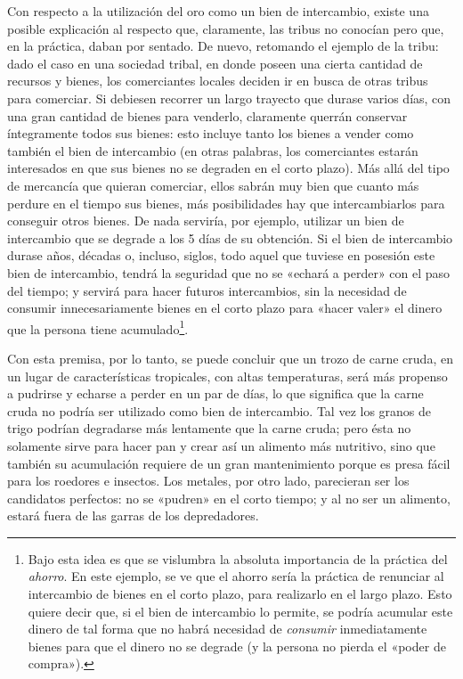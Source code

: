 \documentclass[12pt,a4paper,twoside]{book}
\begin{document}
Con respecto a la utilización del oro como un bien de intercambio, existe una posible explicación al respecto que, claramente, las tribus no conocían pero que, en la práctica, daban por sentado. De nuevo, retomando el ejemplo de la tribu: dado el caso en una sociedad tribal, en donde poseen una cierta cantidad de recursos y bienes, los comerciantes locales deciden ir en busca de otras tribus para comerciar. Si debiesen recorrer un largo trayecto que durase varios días, con una gran cantidad de bienes para venderlo, claramente querrán conservar íntegramente todos sus bienes: esto incluye tanto los bienes a vender como también el bien de intercambio (en otras palabras, los comerciantes estarán interesados en que sus bienes no se degraden en el corto plazo). Más allá del tipo de mercancía que quieran comerciar, ellos sabrán muy bien que cuanto más perdure en el tiempo sus bienes, más posibilidades hay que intercambiarlos para conseguir otros bienes. De nada serviría, por ejemplo, utilizar un bien de intercambio que se degrade a los 5 días de su obtención. Si el bien de intercambio durase años, décadas o, incluso, siglos, todo aquel que tuviese en posesión este bien de intercambio, tendrá la seguridad que no se «echará a perder» con el paso del tiempo; y servirá para hacer futuros intercambios, sin la necesidad de consumir innecesariamente bienes en el corto plazo para «hacer valer» el dinero que la persona tiene acumulado\footnote{Bajo esta idea es que se vislumbra la absoluta importancia de la práctica del \textit{ahorro}. En este ejemplo, se ve que el ahorro sería la práctica de renunciar al intercambio de bienes en el corto plazo, para realizarlo en el largo plazo. Esto quiere decir que, si el bien de intercambio lo permite, se podría acumular este dinero de tal forma que no habrá necesidad de \textit{consumir} inmediatamente bienes para que el dinero no se degrade (y la persona no pierda el «poder de compra»).}.

Con esta premisa, por lo tanto, se puede concluir que un trozo de carne cruda, en un lugar de características tropicales, con altas temperaturas, será más propenso a pudrirse y echarse a perder en un par de días, lo que significa que la carne cruda no podría ser utilizado como bien de intercambio. Tal vez los granos de trigo podrían degradarse más lentamente que la carne cruda; pero ésta no solamente sirve para hacer pan y crear así un alimento más nutritivo, sino que también su acumulación requiere de un gran mantenimiento porque es presa fácil para los roedores e insectos. Los metales, por otro lado, parecieran ser los candidatos perfectos: no se «pudren» en el corto tiempo; y al no ser un alimento, estará fuera de las garras de los depredadores.
\end{document}
